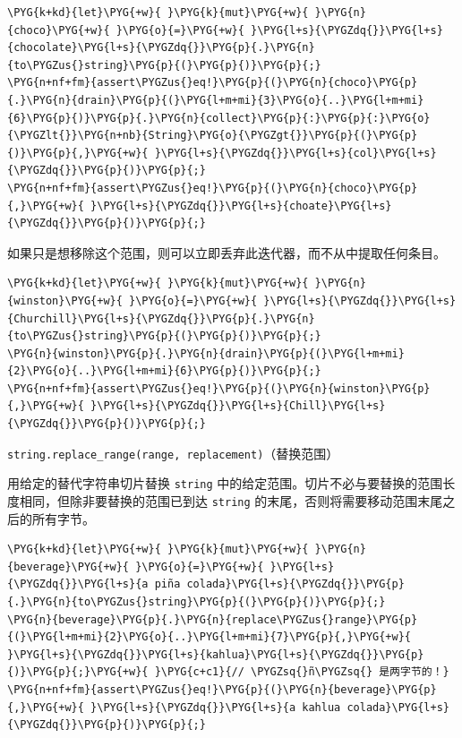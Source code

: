 \begin{Verbatim}[commandchars=\\\{\},breaklines=true,breakanywhere=true,fontsize=\codefont,xleftmargin=17bp]
\PYG{k+kd}{let}\PYG{+w}{ }\PYG{k}{mut}\PYG{+w}{ }\PYG{n}{choco}\PYG{+w}{ }\PYG{o}{=}\PYG{+w}{ }\PYG{l+s}{\PYGZdq{}}\PYG{l+s}{chocolate}\PYG{l+s}{\PYGZdq{}}\PYG{p}{.}\PYG{n}{to\PYGZus{}string}\PYG{p}{(}\PYG{p}{)}\PYG{p}{;}
\PYG{n+nf+fm}{assert\PYGZus{}eq!}\PYG{p}{(}\PYG{n}{choco}\PYG{p}{.}\PYG{n}{drain}\PYG{p}{(}\PYG{l+m+mi}{3}\PYG{o}{..}\PYG{l+m+mi}{6}\PYG{p}{)}\PYG{p}{.}\PYG{n}{collect}\PYG{p}{:}\PYG{p}{:}\PYG{o}{\PYGZlt{}}\PYG{n+nb}{String}\PYG{o}{\PYGZgt{}}\PYG{p}{(}\PYG{p}{)}\PYG{p}{,}\PYG{+w}{ }\PYG{l+s}{\PYGZdq{}}\PYG{l+s}{col}\PYG{l+s}{\PYGZdq{}}\PYG{p}{)}\PYG{p}{;}
\PYG{n+nf+fm}{assert\PYGZus{}eq!}\PYG{p}{(}\PYG{n}{choco}\PYG{p}{,}\PYG{+w}{ }\PYG{l+s}{\PYGZdq{}}\PYG{l+s}{choate}\PYG{l+s}{\PYGZdq{}}\PYG{p}{)}\PYG{p}{;}
\end{Verbatim}

如果只是想移除这个范围，则可以立即丢弃此迭代器，而不从中提取任何条目。

\begin{Verbatim}[commandchars=\\\{\},breaklines=true,breakanywhere=true,fontsize=\codefont,xleftmargin=17bp]
\PYG{k+kd}{let}\PYG{+w}{ }\PYG{k}{mut}\PYG{+w}{ }\PYG{n}{winston}\PYG{+w}{ }\PYG{o}{=}\PYG{+w}{ }\PYG{l+s}{\PYGZdq{}}\PYG{l+s}{Churchill}\PYG{l+s}{\PYGZdq{}}\PYG{p}{.}\PYG{n}{to\PYGZus{}string}\PYG{p}{(}\PYG{p}{)}\PYG{p}{;}
\PYG{n}{winston}\PYG{p}{.}\PYG{n}{drain}\PYG{p}{(}\PYG{l+m+mi}{2}\PYG{o}{..}\PYG{l+m+mi}{6}\PYG{p}{)}\PYG{p}{;}
\PYG{n+nf+fm}{assert\PYGZus{}eq!}\PYG{p}{(}\PYG{n}{winston}\PYG{p}{,}\PYG{+w}{ }\PYG{l+s}{\PYGZdq{}}\PYG{l+s}{Chill}\PYG{l+s}{\PYGZdq{}}\PYG{p}{)}\PYG{p}{;}
\end{Verbatim}

\begin{myNote}
\texttt{string.replace\_range(range, replacement)}（替换范围）
\end{myNote}

用给定的替代字符串切片替换 \texttt{string} 中的给定范围。切片不必与要替换的范围长度相同，但除非要替换的范围已到达 \texttt{string} 的末尾，否则将需要移动范围末尾之后的所有字节。

\begin{Verbatim}[commandchars=\\\{\},breaklines=true,breakanywhere=true,fontsize=\codefont,xleftmargin=17bp]
\PYG{k+kd}{let}\PYG{+w}{ }\PYG{k}{mut}\PYG{+w}{ }\PYG{n}{beverage}\PYG{+w}{ }\PYG{o}{=}\PYG{+w}{ }\PYG{l+s}{\PYGZdq{}}\PYG{l+s}{a piña colada}\PYG{l+s}{\PYGZdq{}}\PYG{p}{.}\PYG{n}{to\PYGZus{}string}\PYG{p}{(}\PYG{p}{)}\PYG{p}{;}
\PYG{n}{beverage}\PYG{p}{.}\PYG{n}{replace\PYGZus{}range}\PYG{p}{(}\PYG{l+m+mi}{2}\PYG{o}{..}\PYG{l+m+mi}{7}\PYG{p}{,}\PYG{+w}{ }\PYG{l+s}{\PYGZdq{}}\PYG{l+s}{kahlua}\PYG{l+s}{\PYGZdq{}}\PYG{p}{)}\PYG{p}{;}\PYG{+w}{ }\PYG{c+c1}{// \PYGZsq{}ñ\PYGZsq{} 是两字节的！}
\PYG{n+nf+fm}{assert\PYGZus{}eq!}\PYG{p}{(}\PYG{n}{beverage}\PYG{p}{,}\PYG{+w}{ }\PYG{l+s}{\PYGZdq{}}\PYG{l+s}{a kahlua colada}\PYG{l+s}{\PYGZdq{}}\PYG{p}{)}\PYG{p}{;}
\end{Verbatim}

